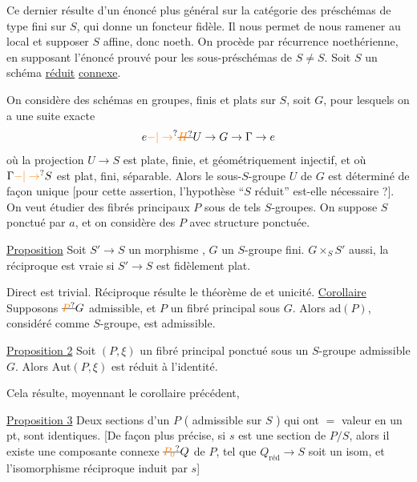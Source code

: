 Ce dernier  résulte d'un
énoncé plus général sur la catégorie des
préschémas de type fini sur $S$, qui donne
un foncteur  fidèle. Il nous permet
de nous ramener au local et supposer $S$
affine, donc noeth. On procède par
récurrence noethérienne, en supposant l'énoncé
prouvé pour les sous-préschémas  de
$S\ne S$.
Soit $S$ un schéma \uline{réduit} \uline{connexe}.

On considère des schémas en groupes, finis et plats sur $S$,
soit $G$, pour lesquels on a une suite exacte
\[
e\unsure{-|\to}\deleted{\unsure{H}}U\to G\to\Gamma\to e
\]
où la projection $U\to S$ est plate, finie,  et
géométriquement  injectif,
et où $\Gamma\unsure{-|\to}S$ est plat, fini, séparable. Alors le
sous-$S$-groupe $U$ de $G$ est déterminé de
façon unique [pour cette assertion, l'hypothèse
``$S$ réduit'' est-elle nécessaire ?].
On veut étudier des fibrés principaux  $P$ sous
de tels $S$-groupes. On suppose $S$ ponctué
par $a$\deleted{\unsure{$\xi$}}, et on considère des $P$ avec
structure ponctuée.

\uline{Proposition}  Soit $S'\to S$ un morphisme
, $G$ un $S$-groupe
fini.
  $G\times_S S'$ aussi,
la réciproque est vraie si $S'\to S$ est fidèlement plat.

Direct est trivial. Réciproque résulte 
le théorème de  et unicité.
\uline{Corollaire} Supposons $\deleted{\unsure{P}}G$ admissible, et $P$ un
fibré principal sous $G$. Alors $\mathrm{ad}(P)$, considéré
comme $S$-groupe, est admissible.

\uline{Proposition 2} Soit $(P,\xi)$ un fibré principal ponctué
sous un $S$-groupe admissible $G$. Alors
$\mathrm{Aut}(P,\xi)$ est réduit à l'identité.

Cela résulte, moyennant le corollaire précédent,

 \uline{Proposition 3} Deux sections d'un
$P$ ( admissible sur $S$ ) qui ont $=$ valeur
en un pt, sont identiques. [De façon
plus précise, si $s$ est une section de $P/S$,
alors il existe une composante connexe
$\deleted{\unsure{P_0}}Q$ de $P$, tel que $Q_{\text{réd}}\to S$ soit un
isom, et l'isomorphisme réciproque induit par $s$]

